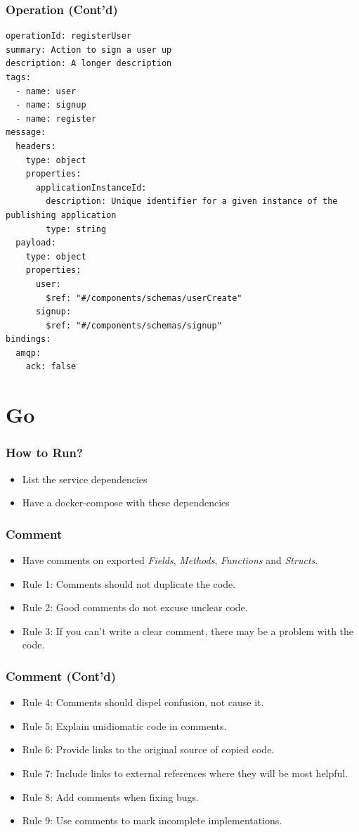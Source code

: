 \documentclass{efd-lecture}
\begin{document}
\begin{frame}[fragile]
  \frametitle{Operation (Cont'd)}
  \begin{verbatim}
operationId: registerUser
summary: Action to sign a user up
description: A longer description
tags:
  - name: user
  - name: signup
  - name: register
message:
  headers:
    type: object
    properties:
      applicationInstanceId:
        description: Unique identifier for a given instance of the publishing application
        type: string
  payload:
    type: object
    properties:
      user:
        $ref: "#/components/schemas/userCreate"
      signup:
        $ref: "#/components/schemas/signup"
bindings:
  amqp:
    ack: false
  \end{verbatim}
\end{frame}

\section{Go}

\begin{frame}
  \frametitle{How to Run?}
  \begin{itemize}
    \item List the service dependencies
    \item Have a docker-compose with these dependencies
  \end{itemize}
\end{frame}

\begin{frame}
  \frametitle{Comment}
  \begin{itemize}
    \item Have comments on exported \textit{\color{YellowOrange}Fields}, \textit{\color{LimeGreen}Methods},
      \textit{\color{Cyan}Functions} and \textit{\color{RubineRed}Structs}.
    \item Rule 1: Comments should not duplicate the code.
    \item Rule 2: Good comments do not excuse unclear code.
    \item Rule 3: If you can’t write a clear comment, there may be a problem with the code.
  \end{itemize}
\end{frame}

\begin{frame}
  \frametitle{Comment (Cont'd)}
  \begin{itemize}
    \item Rule 4: Comments should dispel confusion, not cause it.
    \item Rule 5: Explain unidiomatic code in comments.
    \item Rule 6: Provide links to the original source of copied code.
    \item Rule 7: Include links to external references where they will be most helpful.
    \item Rule 8: Add comments when fixing bugs.
    \item Rule 9: Use comments to mark incomplete implementations.
  \end{itemize}
\end{frame}
\end{document}
